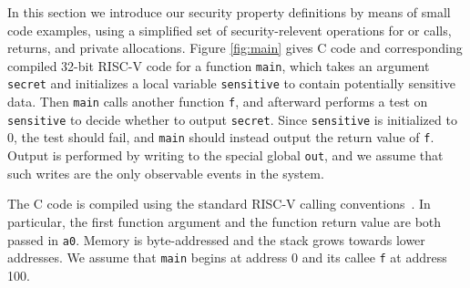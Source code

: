 \documentclass[10pt,conference]{ieeetran}%
\theoremstyle{definition}
\begin{document}
In this section we introduce our security property definitions by means
of small code examples, using a simplified set of security-relevent operations for
or calls, returns, and private allocations.
Figure \ref{fig:main} gives C code and corresponding compiled 32-bit RISC-V code
for a function {\tt main}, which
takes an argument {\tt secret} and initializes a local variable {\tt sensitive} to contain
potentially sensitive data.
Then {\tt main} calls another function {\tt f},
and afterward performs a test on {\tt sensitive} to decide whether
to output {\tt secret}.  Since {\tt sensitive} is initialized to 0,
the test should fail, and {\tt main} should instead output the return value of {\tt f}.
Output is performed by writing to the special global {\tt out},
and we assume that such writes are the only observable events in the system.

The C code is compiled using the standard RISC-V calling conventions~\cite{RISC-V-CC}.
In particular, the first function argument and the function
return value are both passed in {\tt a0}.
Memory is byte-addressed and the stack grows towards
lower addresses. We assume that {\tt main} begins at address 0 and its callee {\tt f} at address 100.
\end{document}
